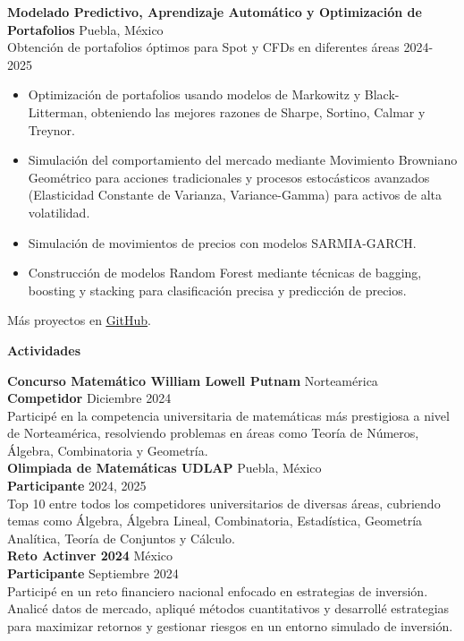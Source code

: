 \documentclass[9pt]{extarticle} %
\begin{document}
\textbf{Modelado Predictivo, Aprendizaje Automático y Optimización de Portafolios} \hfill Puebla, México\\  
Obtención de portafolios óptimos para Spot y CFDs en diferentes áreas \hfill 2024-2025  
\begin{itemize}[noitemsep, topsep=0pt, partopsep=0pt, parsep=0pt]  
    \item Optimización de portafolios usando modelos de Markowitz y Black-Litterman, obteniendo las mejores razones de Sharpe, Sortino, Calmar y Treynor.  
    \item Simulación del comportamiento del mercado mediante Movimiento Browniano Geométrico para acciones tradicionales y procesos estocásticos avanzados (Elasticidad Constante de Varianza, Variance-Gamma) para activos de alta volatilidad.  
    \item Simulación de movimientos de precios con modelos SARMIA-GARCH.  
    \item Construcción de modelos Random Forest mediante técnicas de bagging, boosting y stacking para clasificación precisa y predicción de precios.    
\end{itemize}  
Más proyectos en \href{https://github.com/heritaco}{\textcolor{customblue}{\underline{GitHub}}}.

\begin{center}  
    \vspace{1ex}  
    \textbf{Actividades}  
    \vspace{-1ex}  
\end{center}

\textbf{Concurso Matemático William Lowell Putnam} \hfill Norteamérica\\  
\textbf{Competidor} \hfill Diciembre 2024\\  
Participé en la competencia universitaria de matemáticas más prestigiosa a nivel de Norteamérica, resolviendo problemas en áreas como Teoría de Números, Álgebra, Combinatoria y Geometría.\\

\textbf{Olimpiada de Matemáticas UDLAP} \hfill Puebla, México\\  
\textbf{Participante} \hfill 2024, 2025\\  
Top 10 entre todos los competidores universitarios de diversas áreas, cubriendo temas como Álgebra, Álgebra Lineal, Combinatoria, Estadística, Geometría Analítica, Teoría de Conjuntos y Cálculo.\\

\textbf{Reto Actinver 2024} \hfill México\\  
\textbf{Participante} \hfill Septiembre 2024\\  
Participé en un reto financiero nacional enfocado en estrategias de inversión. Analicé datos de mercado, apliqué métodos cuantitativos y desarrollé estrategias para maximizar retornos y gestionar riesgos en un entorno simulado de inversión.\\
\end{document}
